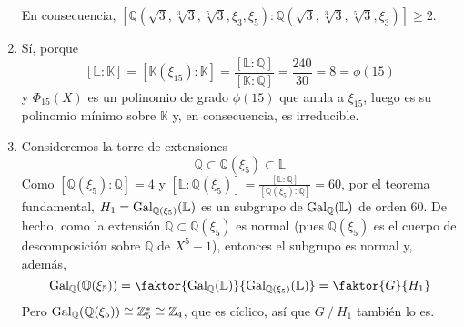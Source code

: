 \documentclass[11pt]{report}
\makeatletter
\renewenvironment{proof}[1][\proofname]{\par
  \pushQED{\qed}%
  \normalfont \topsep\z@skip %
  \trivlist
  \item[\hskip\labelsep
        \itshape
    #1\@addpunct{.}]\ignorespaces
}{%
  \popQED\endtrivlist\@endpefalse
}
\newcommand{\Z}{\mathbb Z}
\newcommand{\Q}{\mathbb Q}
\newcommand{\K}{\mathbb K}
\renewcommand{\L}{\mathbb L}
\makeatother
\begin{document}
\begin{proof}
\begin{enumerate}
{    En consecuencia, $[\Q(\sqrt{3},\sqrt[3]{3},\sqrt[5]{3},\xi_3,\xi_5) \colon \Q(\sqrt{3},\sqrt[3]{3},\sqrt[5]{3},\xi_3)] \geq 2$.}
    \item Sí, porque \[[\L \colon \K]=[\K(\xi_{15}) \colon \K] = \frac{[\L \colon \Q]}{[\K \colon \Q]} = \frac{240}{30} = 8 = \phi(15)\] y $\Phi_{15}(X)$ es un polinomio de grado $\phi(15)$ que anula a $\xi_{15}$, luego es su polinomio mínimo sobre $\K$ y, en consecuencia, es irreducible.
    \item Consideremos la torre de extensiones
    \[\Q \subset \Q(\xi_5) \subset \L\]
    Como $[\Q(\xi_5) \colon \Q] = 4$ y $[\L \colon \Q(\xi_5)] = \frac{[\L \colon \Q]}{[\Q(\xi_5) \colon \Q]} = 60$, por el teorema fundamental, $ H_1=\textup{Gal}_{\Q(\xi_5)}(\L)$ es un subgrupo de $\textup{Gal}_\Q(\L)$ de orden 60. De hecho, como la extensión $\Q \subset \Q(\xi_5)$ es normal (pues $\Q(\xi_5)$ es el cuerpo de descomposición sobre $\Q$ de $X^5-1$), entonces el subgrupo es normal y, además,
    \[\textup{Gal}_\Q(\Q(\xi_5)) = \faktor{\textup{Gal}_\Q(\L)}{\textup{Gal}_{\Q(\xi_5)}(\L)} = \faktor{G}{H_1} \]
    Pero $\textup{Gal}_\Q(\Q(\xi_5)) \cong \Z_5^* \cong \Z_4$, que es cíclico, así que $G \ / \ H_1$ también lo es.


\end{enumerate}
\end{proof}
\end{document}
